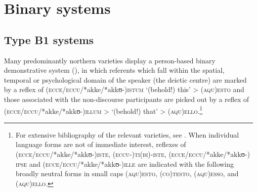 \documentclass[output=paper]{langsci/langscibook}
\begin{document}
\section{Binary systems}\label{bkm:Ref370483093}

\subsection{Type B1 systems}\label{bkm:Ref370487730}

Many predominantly northern  varieties display a person-based binary
demonstrative system (), in which referents which fall
within the spatial, temporal or psychological domain of the speaker (the
deictic centre) are marked by a reflex of
\textsc{(ecce/eccu/}*akke\textsc{/*}akkʊ-\textsc{)istum} ‘(behold!) this’ >
(\textsc{aqu)esto} and those associated with the non-discourse participants are
picked out by a reflex of
\textsc{(ecce/eccu/}*akke\textsc{/*}akkʊ\nobreakdash-\textsc{)illum} >
‘(behold!) that’ > \textsc{(aqu)ello}.\footnote{For extensive bibliography of
    the relevant varieties, see \citet[879]{Ledgeway:2016ab}. When individual
    language forms are not of immediate interest, reflexes of
    (\textsc{ecce/eccu/*}akke/\mbox{*akkʊ-)}\textsc{iste},
    (\textsc{eccu-)ti(bi)-iste}, \textsc{(ecce/eccu/*}akke/*akkʊ-)\textsc{%
    ipse} and \textsc{(ecce/eccu/*}akke/*akkʊ-)\textsc{ille} are indicated with
    the following broadly neutral  forms in small caps
    (\textsc{aqu)esto,} \textsc{(co)testo,} \textsc{(aqu)esso}, and
\textsc{(aqu)ello}.}
\end{document}
